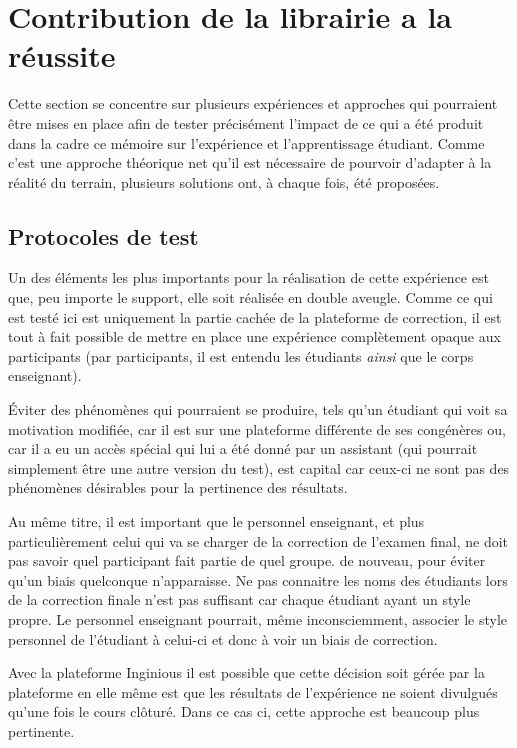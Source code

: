 \documentclass[a4paper]{report}
\begin{document}
\section{Contribution de la librairie a la réussite}
Cette section se concentre sur plusieurs expériences et approches qui pourraient être mises en place afin de tester précisément l'impact de ce qui a été produit dans la cadre ce mémoire sur l'expérience et l'apprentissage étudiant.
Comme c'est une approche théorique net qu'il est nécessaire de pourvoir d'adapter à la réalité du terrain, plusieurs solutions ont, à chaque fois, été proposées.


\subsection{Protocoles de test}

Un des éléments les plus importants pour la réalisation de cette expérience est que, peu importe le support, elle soit réalisée en double aveugle.
Comme ce qui est testé ici est uniquement la partie cachée de la plateforme de correction, il est tout à fait possible de mettre en place une expérience complètement opaque aux participants (par participants, il est entendu les étudiants \textit{ainsi} que le corps enseignant).

Éviter des phénomènes qui pourraient se produire, tels qu'un étudiant qui voit sa motivation modifiée, car il est sur une plateforme différente de ses congénères ou, car il a eu un accès spécial qui lui a été donné par un assistant (qui pourrait simplement être une autre version du test), est capital car ceux-ci ne sont pas des phénomènes désirables pour  la pertinence des résultats.

Au même titre, il est important que le personnel enseignant, et plus particulièrement celui qui va se charger de la correction de l'examen final, ne doit pas savoir quel participant fait partie de quel groupe.
de nouveau, pour éviter qu'un biais quelconque n'apparaisse.
Ne pas connaitre les noms des étudiants lors de la correction finale n'est pas suffisant car chaque étudiant ayant un style propre.
Le personnel enseignant pourrait, même inconsciemment, associer le style personnel de l'étudiant à celui-ci et donc à voir un biais de correction.

Avec la plateforme Inginious il est possible que cette décision soit gérée par la plateforme en elle même est que les résultats de l'expérience ne soient divulgués qu'une fois le cours clôturé.
Dans ce cas ci, cette approche est beaucoup plus pertinente.
\end{document}
